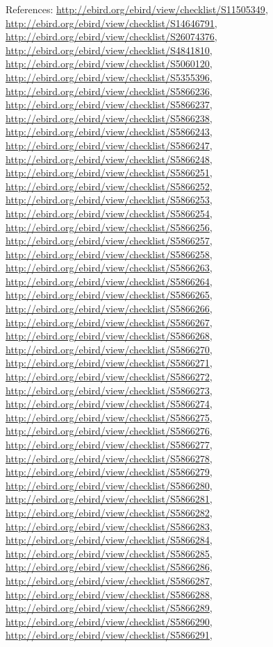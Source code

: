 \documentclass[9pt, article]{memoir}
\begin{document}
\begin{multicols}{2}
References: 
\url{http://ebird.org/ebird/view/checklist/S11505349}, 
\url{http://ebird.org/ebird/view/checklist/S14646791}, 
\url{http://ebird.org/ebird/view/checklist/S26074376}, 
\url{http://ebird.org/ebird/view/checklist/S4841810}, 
\url{http://ebird.org/ebird/view/checklist/S5060120}, 
\url{http://ebird.org/ebird/view/checklist/S5355396}, 
\url{http://ebird.org/ebird/view/checklist/S5866236}, 
\url{http://ebird.org/ebird/view/checklist/S5866237}, 
\url{http://ebird.org/ebird/view/checklist/S5866238}, 
\url{http://ebird.org/ebird/view/checklist/S5866243}, 
\url{http://ebird.org/ebird/view/checklist/S5866247}, 
\url{http://ebird.org/ebird/view/checklist/S5866248}, 
\url{http://ebird.org/ebird/view/checklist/S5866251}, 
\url{http://ebird.org/ebird/view/checklist/S5866252}, 
\url{http://ebird.org/ebird/view/checklist/S5866253}, 
\url{http://ebird.org/ebird/view/checklist/S5866254}, 
\url{http://ebird.org/ebird/view/checklist/S5866256}, 
\url{http://ebird.org/ebird/view/checklist/S5866257}, 
\url{http://ebird.org/ebird/view/checklist/S5866258}, 
\url{http://ebird.org/ebird/view/checklist/S5866263}, 
\url{http://ebird.org/ebird/view/checklist/S5866264}, 
\url{http://ebird.org/ebird/view/checklist/S5866265}, 
\url{http://ebird.org/ebird/view/checklist/S5866266}, 
\url{http://ebird.org/ebird/view/checklist/S5866267}, 
\url{http://ebird.org/ebird/view/checklist/S5866268}, 
\url{http://ebird.org/ebird/view/checklist/S5866270}, 
\url{http://ebird.org/ebird/view/checklist/S5866271}, 
\url{http://ebird.org/ebird/view/checklist/S5866272}, 
\url{http://ebird.org/ebird/view/checklist/S5866273}, 
\url{http://ebird.org/ebird/view/checklist/S5866274}, 
\url{http://ebird.org/ebird/view/checklist/S5866275}, 
\url{http://ebird.org/ebird/view/checklist/S5866276}, 
\url{http://ebird.org/ebird/view/checklist/S5866277}, 
\url{http://ebird.org/ebird/view/checklist/S5866278}, 
\url{http://ebird.org/ebird/view/checklist/S5866279}, 
\url{http://ebird.org/ebird/view/checklist/S5866280}, 
\url{http://ebird.org/ebird/view/checklist/S5866281}, 
\url{http://ebird.org/ebird/view/checklist/S5866282}, 
\url{http://ebird.org/ebird/view/checklist/S5866283}, 
\url{http://ebird.org/ebird/view/checklist/S5866284}, 
\url{http://ebird.org/ebird/view/checklist/S5866285}, 
\url{http://ebird.org/ebird/view/checklist/S5866286}, 
\url{http://ebird.org/ebird/view/checklist/S5866287}, 
\url{http://ebird.org/ebird/view/checklist/S5866288}, 
\url{http://ebird.org/ebird/view/checklist/S5866289}, 
\url{http://ebird.org/ebird/view/checklist/S5866290}, 
\url{http://ebird.org/ebird/view/checklist/S5866291}, 

\end{multicols}
\end{document}
